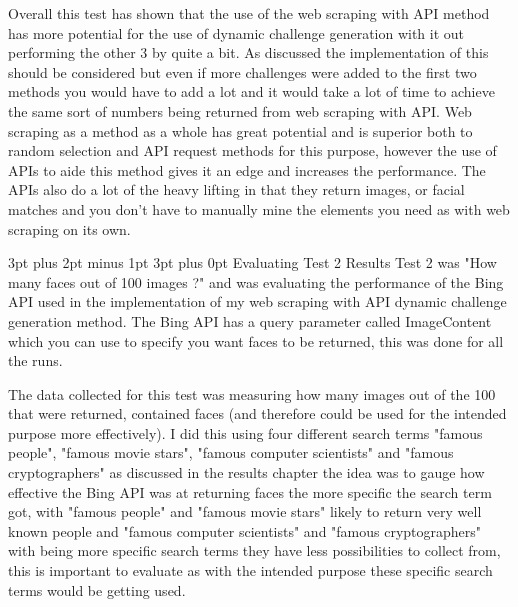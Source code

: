 \documentclass[12pt,a4paper]{article}
\makeatletter
\renewcommand\subsection{\@startsection {subsection}{1}{2mm} %
                               {3pt plus 2pt minus 1pt} %
                               {3pt plus 0pt} %
                               {\normalfont\bfseries}}
\makeatother
\begin{document}
Overall this test has shown that the use of the web scraping with API method has more potential for the use of dynamic challenge generation with it out performing the other 3 by quite a bit. As discussed the implementation of this should be considered but even if more challenges were added to the first two methods you would have to add a lot and it would take a lot of time to achieve the same sort of numbers being returned from web scraping with API. Web scraping as a method as a whole has great potential and is superior both to random selection and API request methods for this purpose, however the use of APIs to aide this method gives it an edge and increases the performance. The APIs also do a lot of the heavy lifting in that they return images, or facial matches and you don't have to manually mine the elements you need as with web scraping on its own. 

\subsection{Evaluating Test 2 Results}  
Test 2 was "How many faces out of 100 images ?" and was evaluating the performance of the Bing API used in the implementation of my web scraping with API dynamic challenge generation method. The Bing API has a query parameter called ImageContent which you can use to specify you want faces to be returned, this was done for all the runs.

The data collected for this test was measuring how many images out of the 100 that were returned, contained faces (and therefore could be used for the intended purpose more effectively). I did this using four different search terms "famous people", "famous movie stars", "famous computer scientists" and "famous cryptographers" as discussed in the results chapter the idea was to gauge how effective the Bing API was at returning faces the more specific the search term got, with "famous people" and "famous movie stars" likely to return very well known people and "famous computer scientists" and "famous cryptographers" with being more specific search terms they have less possibilities to collect from, this is important to evaluate as with the intended purpose these specific search terms would be getting used.  
\end{document}
